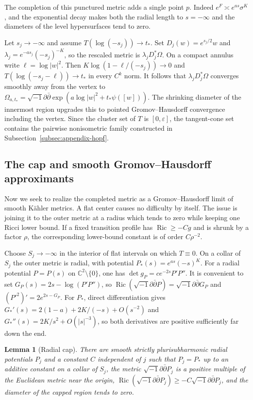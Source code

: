 \documentclass[11pt]{amsart}
\newtheorem{lemma}[theorem]{Lemma}
\theoremstyle{definition}
\theoremstyle{remark}
\begin{document}
The completion of this punctured metric adds a single point $p$.  Indeed $e^F\asymp e^{as}\sigma^K$, and the exponential decay makes both the radial length to $s=-\infty$ and the diameters of the level hypersurfaces tend to zero.

Let $s_j\to-\infty$ and assume $T(\log(-s_j))\to t_*$.  Set $D_j(w)=e^{s_j/2}w$ and $\lambda_j=e^{-as_j}(-s_j)^{-K}$, so the rescaled metric is $\lambda_jD_j^*\Omega$.  On a compact annulus write $\ell=\log|w|^2$.  Then $K\log(1-\ell/(-s_j))\to0$ and $T(\log(-s_j-\ell))\to t_*$ in every $C^k$ norm.  It follows that $\lambda_jD_j^*\Omega$ converges smoothly away from the vertex to $\Omega_{a,t_*}=\sqrt{-1}\partial\bar\partial\exp(a\log|w|^2+t_*\psi([w]))$.  The shrinking diameter of the innermost region upgrades this to pointed Gromov--Hausdorff convergence including the vertex.  Since the cluster set of $T$ is $[0,\varepsilon]$, the tangent-cone set contains the pairwise nonisometric family constructed in Subsection~\ref{subsec:appendix-hopf}.

\subsection{The cap and smooth Gromov--Hausdorff approximants}
\label{subsec:appendix-cap}

Now we seek to realize the completed metric as a Gromov--Hausdorff limit of smooth K\"ahler metrics.  A flat center causes no difficulty by itself.  The issue is joining it to the outer metric at a radius which tends to zero while keeping one Ricci lower bound.  If a fixed transition profile has $\operatorname{Ric}\geq-Cg$ and is shrunk by a factor $\rho$, the corresponding lower-bound constant is of order $C\rho^{-2}$.

Choose $S_j\to-\infty$ in the interior of flat intervals on which $T\equiv0$.  On a collar of $S_j$ the outer metric is radial, with potential $P_*(s)=e^{as}(-s)^K$.  For a radial potential $P=P(s)$ on $\mathbb C^2\setminus\{0\}$, one has $\det g_P=c e^{-2s}P'P''$.  It is convenient to set $G_P(s)=2s-\log(P'P'')$, so $\operatorname{Ric}(\sqrt{-1}\partial\bar\partial P)=\sqrt{-1}\partial\bar\partial G_P$ and $(P'^2)'=2e^{2s-G_P}$.  For $P_*$, direct differentiation gives $G_*'(s)=2(1-a)+2K/(-s)+O(s^{-2})$ and $G_*''(s)=2K/s^2+O(|s|^{-3})$, so both derivatives are positive sufficiently far down the end.

\begin{lemma}[Radial cap]
\label{lem:appendix-cap}
There are smooth strictly plurisubharmonic radial potentials $P_j$ and a constant $C$ independent of $j$ such that $P_j=P_*$ up to an additive constant on a collar of $S_j$, the metric $\sqrt{-1}\partial\bar\partial P_j$ is a positive multiple of the Euclidean metric near the origin, $\operatorname{Ric}(\sqrt{-1}\partial\bar\partial P_j)\geq-C\sqrt{-1}\partial\bar\partial P_j$, and the diameter of the capped region tends to zero.
\end{lemma}
\end{document}
